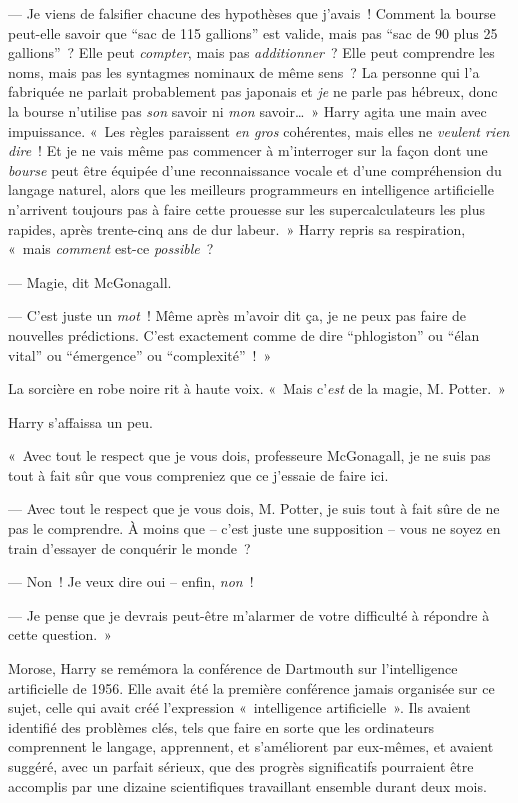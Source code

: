 --- Je viens de falsifier chacune des hypothèses que j'avais~!
Comment la bourse peut-elle savoir que “sac de 115 gallions” est valide, mais pas “sac de 90 plus 25 gallions”~? Elle peut \emph{compter}, mais pas \emph{additionner}~? Elle peut comprendre les noms, mais pas les syntagmes nominaux de même sens~?
La personne qui l'a fabriquée ne parlait probablement pas japonais et \emph{je} ne parle pas hébreux, donc la bourse n'utilise pas \emph{son} savoir ni \emph{mon} savoir…~» Harry agita une main avec impuissance. «~Les règles paraissent \emph{en gros} cohérentes, mais elles ne \emph{veulent rien dire}~! Et je ne vais même pas commencer à m'interroger sur la façon dont une \emph{bourse} peut être équipée d'une reconnaissance vocale et d'une compréhension du langage naturel, alors que les meilleurs programmeurs en intelligence artificielle n'arrivent toujours pas à faire cette prouesse sur les supercalculateurs les plus rapides, après trente-cinq ans de dur labeur.~»
Harry repris sa respiration, «~mais \emph{comment} est-ce \emph{possible}~?

--- Magie, dit McGonagall.

--- C'est juste un \emph{mot}~! Même après m'avoir dit ça, je ne peux pas faire de nouvelles prédictions. C'est exactement comme de dire “phlogiston” ou “élan vital” ou “émergence” ou “complexité”~!~»

La sorcière en robe noire rit à haute voix. «~Mais c'\emph{est} de la magie, M. Potter.~»

Harry s'affaissa un peu.

«~Avec tout le respect que je vous dois, professeure McGonagall, je ne suis pas tout à fait sûr que vous compreniez que ce j'essaie de faire ici.

--- Avec tout le respect que je vous dois, M. Potter, je suis tout à fait sûre de ne pas le comprendre. À moins que -- c'est juste une supposition -- vous ne soyez en train d'essayer de conquérir le monde~?

--- Non~! Je veux dire oui -- enfin, \emph{non}~!

--- Je pense que je devrais peut-être m'alarmer de votre difficulté à répondre à cette question.~»

Morose, Harry se remémora la conférence de Dartmouth sur l'intelligence artificielle de 1956. Elle avait été la première conférence jamais organisée sur ce sujet, celle qui avait créé l'expression «~intelligence artificielle~». Ils avaient identifié des problèmes clés, tels que faire en sorte que les ordinateurs comprennent le langage, apprennent, et s'améliorent par eux-mêmes, et avaient suggéré, avec un parfait sérieux, que des progrès significatifs pourraient être accomplis par une dizaine scientifiques travaillant ensemble durant deux mois.


